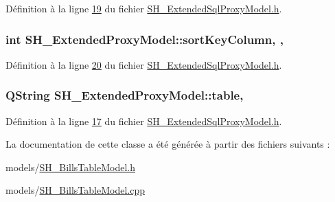 Définition à la ligne \hyperlink{SH__ExtendedSqlProxyModel_8h_source_l00019}{19} du fichier \hyperlink{SH__ExtendedSqlProxyModel_8h_source}{S\-H\-\_\-\-Extended\-Sql\-Proxy\-Model.\-h}.

\hypertarget{classSH__ExtendedProxyModel_a47e2d0b99b84fb066438db667dd1ad26}{
\subsubsection[{sort\-Key\-Column}]{\setlength{\rightskip}{0pt plus 5cm}int S\-H\-\_\-\-Extended\-Proxy\-Model\-::sort\-Key\-Column\hspace{0.3cm}{\ttfamily [read]}, {\ttfamily [write]}, {\ttfamily [inherited]}}}\label{classSH__ExtendedProxyModel_a47e2d0b99b84fb066438db667dd1ad26}


Définition à la ligne \hyperlink{SH__ExtendedSqlProxyModel_8h_source_l00020}{20} du fichier \hyperlink{SH__ExtendedSqlProxyModel_8h_source}{S\-H\-\_\-\-Extended\-Sql\-Proxy\-Model.\-h}.

\hypertarget{classSH__ExtendedProxyModel_a7eef4557a77444e9ce5c24c180392bfa}{
\subsubsection[{table}]{\setlength{\rightskip}{0pt plus 5cm}Q\-String S\-H\-\_\-\-Extended\-Proxy\-Model\-::table\hspace{0.3cm}{\ttfamily [read]}, {\ttfamily [inherited]}}}\label{classSH__ExtendedProxyModel_a7eef4557a77444e9ce5c24c180392bfa}


Définition à la ligne \hyperlink{SH__ExtendedSqlProxyModel_8h_source_l00017}{17} du fichier \hyperlink{SH__ExtendedSqlProxyModel_8h_source}{S\-H\-\_\-\-Extended\-Sql\-Proxy\-Model.\-h}.



La documentation de cette classe a été générée à partir des fichiers suivants \-:\begin{DoxyCompactItemize}
\item 
models/\hyperlink{SH__BillsTableModel_8h}{S\-H\-\_\-\-Bills\-Table\-Model.\-h}\item 
models/\hyperlink{SH__BillsTableModel_8cpp}{S\-H\-\_\-\-Bills\-Table\-Model.\-cpp}\end{DoxyCompactItemize}
